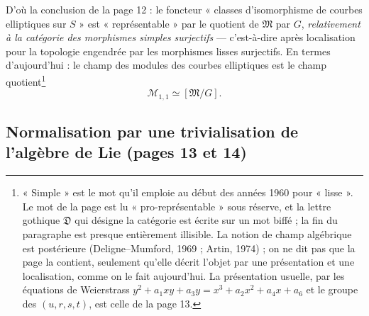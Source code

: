 \documentclass[11pt,a4paper]{article}
\begin{document}
D'où la conclusion de la page 12 : le foncteur « classes d'isomorphisme de
courbes elliptiques sur $S$ » est « représentable » par le quotient de
$\mathfrak{M}$ par $G$, \emph{relativement à la catégorie des morphismes
simples surjectifs} --- c'est-à-dire après localisation pour la topologie
engendrée par les morphismes lisses surjectifs. En termes d'aujourd'hui : le
champ des modules des courbes elliptiques est le champ quotient\footnote{« Simple » est le mot qu'il emploie au début des années 1960 pour
« lisse ». Le mot de la page est lu « pro-représentable » sous réserve, et la
lettre gothique $\mathfrak{D}$ qui désigne la catégorie est écrite sur un mot
biffé ; la fin du paragraphe est presque entièrement illisible. La notion de
champ algébrique est postérieure (Deligne--Mumford, 1969 ; Artin, 1974) ; on
ne dit pas que la page la contient, seulement qu'elle décrit l'objet par une
présentation et une localisation, comme on le fait aujourd'hui. La présentation
usuelle, par les équations de Weierstrass $y^2 + a_1xy + a_3y = x^3 + a_2x^2 +
a_4x + a_6$ et le groupe des $(u, r, s, t)$, est celle de la page 13.}
\[
\mathcal{M}_{1,1} \simeq [\mathfrak{M}/G].
\]


\subsection*{Normalisation par une trivialisation de l'algèbre de Lie (pages 13 et 14)}
\end{document}

